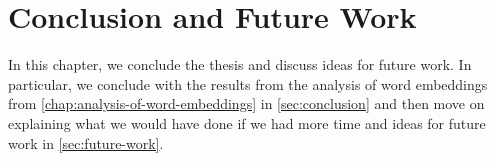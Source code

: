 \chapter{Conclusion and Future Work}
\label{chap:conclusion-and-future-work}
In this chapter, we conclude the thesis and discuss ideas for future work. In particular, we conclude with the results from the analysis of word embeddings from \cref{chap:analysis-of-word-embeddings} in \cref{sec:conclusion} and then move on explaining what we would have done if we had more time and ideas for future work in \cref{sec:future-work}.


